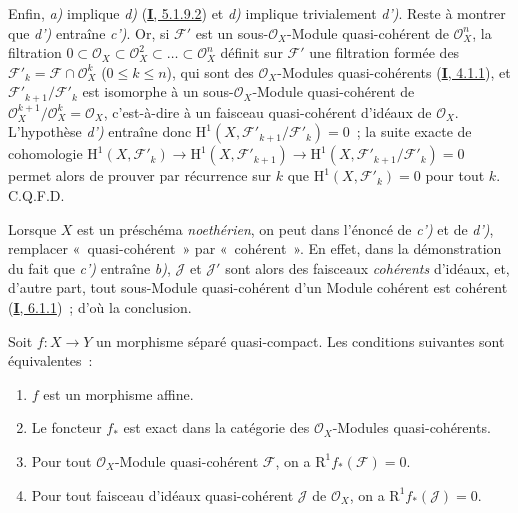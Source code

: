 Enfin, \emph{a)} implique \emph{d)} (\hyperref[I.5.1.9.2-fr]{\textbf{I}, 5.1.9.2}) et \emph{d)} implique
trivialement \emph{d')}. Reste à montrer que \emph{d')} entraîne \emph{c')}. Or, si
$\mathcal{F}'$ est un sous-$\mathcal{O}_X$-Module quasi-cohérent de
$\mathcal{O}_X^n$, la filtration
$0\subset\mathcal{O}_X\subset\mathcal{O}_X^2\subset\ldots\subset
\mathcal{O}_X^n$ définit sur $\mathcal{F}'$ une filtration formée des
$\mathcal{F}'_k=\mathcal{F}\cap\mathcal{O}_X^k$ ($0\leq k\leq n$), qui
sont des $\mathcal{O}_X$-Modules quasi-cohérents
(\hyperref[I.4.1.1-fr]{\textbf{I}, 4.1.1}), et
$\mathcal{F}'_{k+1}/\mathcal{F}'_k$ est isomorphe à un
sous-$\mathcal{O}_X$-Module quasi-cohérent de
$\mathcal{O}_X^{k+1}/\mathcal{O}_X^k=\mathcal{O}_X$, c'est-à-dire à un
faisceau quasi-cohérent d'idéaux de $\mathcal{O}_X$. L'hypothèse \emph{d')}
entraîne donc
$\mathrm{H}^1(X,\mathcal{F}'_{k+1}/\mathcal{F}'_k)=0$~; la suite exacte de
cohomologie
$\mathrm{H}^1(X,\mathcal{F}'_k)\to\mathrm{H}^1(X,\mathcal{F}'_{k+1})
\to\mathrm{H}^1(X,\mathcal{F}'_{k+1}/\mathcal{F}'_k)=0$ permet alors de
prouver par récurrence sur $k$ que
$\mathrm{H}^1(X,\mathcal{F}'_k)=0$ pour tout $k$. C.Q.F.D.

\begin{remark}[5.2.1.1]
\label{II.5.2.1.1-fr}
Lorsque $X$ est un préschéma \emph{noethérien}, on peut dans l'énoncé de \emph{c')} et de
\emph{d')}, remplacer «~quasi-cohérent~» par «~cohérent~». En effet, dans la
démonstration du fait que \emph{c')} entraîne \emph{b)}, $\mathcal{J}$ et $\mathcal{J}'$
sont alors des faisceaux \emph{cohérents} d'idéaux, et, d'autre part, tout
sous-Module quasi-cohérent d'un Module cohérent est cohérent
(\hyperref[I.6.1.1-fr]{\textbf{I}, 6.1.1})~; d'où la conclusion.
\end{remark}

\begin{corollary}[5.2.2]
\label{II.5.2.2-fr}
Soit $f:X\to Y$ un morphisme séparé quasi-compact. Les conditions suivantes
sont équivalentes~:
\begin{enumerate}
  \item[\rm{a)}] $f$ est un morphisme affine.
  \item[\rm{b)}] Le foncteur $f_*$ est exact dans la catégorie des
  $\mathcal{O}_X$-Modules quasi-cohérents.
  \item[\rm{c)}] Pour tout $\mathcal{O}_X$-Module quasi-cohérent
  $\mathcal{F}$, on a $\mathrm{R}^1f_*(\mathcal{F})=0$.
  \item[\rm{c')}] Pour tout faisceau d'idéaux quasi-cohérent $\mathcal{J}$
  de $\mathcal{O}_X$, on a $\mathrm{R}^1f_*(\mathcal{J})=0$.
\end{enumerate}
\end{corollary}

